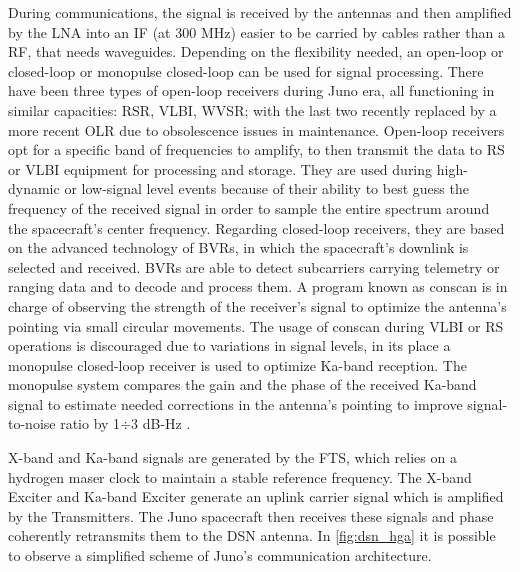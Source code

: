 During communications, the signal is received by the antennas and then amplified by the LNA into an IF (at 300 MHz) easier to be carried by cables rather than a RF, that needs waveguides. Depending on the flexibility needed, an open-loop or closed-loop or monopulse closed-loop can be used for signal processing. There have been three types of open-loop receivers during Juno era, all functioning in similar capacities: RSR, VLBI, WVSR; with the last two recently replaced by a more recent OLR due to obsolescence issues in maintenance\cite{communication_support}. Open-loop receivers opt for a specific band of frequencies to amplify, to then transmit the data to RS or VLBI equipment for processing and storage. They are used during high-dynamic or low-signal level events because of their ability to best guess the frequency of the received signal in order to sample the entire spectrum around the spacecraft's center frequency. Regarding closed-loop receivers, they are based on the advanced technology of BVRs, in which the spacecraft's downlink is selected and received. BVRs are able to detect subcarriers carrying telemetry or ranging data and to decode and process them. A program known as conscan \cite{dsn_sito} is in charge of observing the strength of the receiver's signal to optimize the antenna's pointing via small circular movements. The usage of conscan during VLBI or RS operations is discouraged due to variations in signal levels, in its place a monopulse closed-loop receiver is used to optimize Ka-band reception. The monopulse system compares the gain and the phase of the received Ka-band signal to estimate needed corrections in the antenna's pointing to improve signal-to-noise ratio by 1$\div$3 dB-Hz \cite{ka_uplink}.

X-band and Ka-band signals are generated by the FTS, which relies on a hydrogen maser clock to maintain a stable reference frequency. The X-band Exciter and Ka-band Exciter generate an uplink carrier signal which is amplified by the Transmitters. The Juno spacecraft then receives these signals and phase coherently retransmits them to the DSN antenna.
In \autoref{fig:dsn_hga} it is possible to observe a simplified scheme of Juno's communication architecture.

